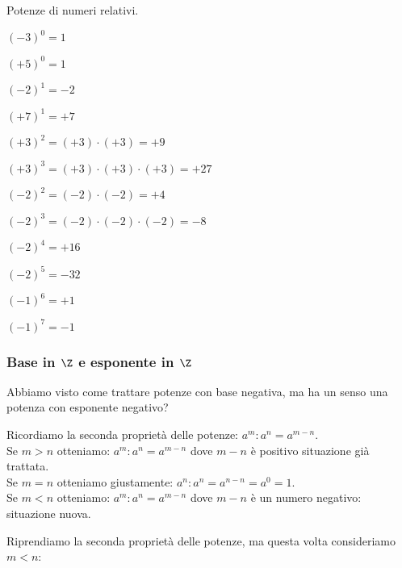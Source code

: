 \begin{esempio}{}{}
Potenze di numeri relativi.
\begin{multicols}{2}
\begin{itemize*}
\item \((-3)^0=1\)
\item \((+5)^0=1\) 
\item \((-2)^1=-2\) 
\item \((+7)^1=+7\) 
\item \((+3)^2=(+3)\cdot(+3)=+9\)
\item \((+3)^3=(+3)\cdot(+3)\cdot(+3)=+27\)
\item \((-2)^2=(-2)\cdot(-2)=+4\)
\item \((-2)^3=(-2)\cdot(-2)\cdot(-2)=-8\)
\item \((-2)^4=+16\)
\item \((-2)^5=-32\)
\item \((-1)^6=+1\)
\item \((-1)^7=-1\)
\end{itemize*}
\end{multicols}
\end{esempio}

% 

\subsubsection{Base in \(\Z\) e esponente in \(\Z\)}

Abbiamo visto come trattare potenze con base negativa, ma ha un senso una 
potenza con esponente negativo?

Ricordiamo la seconda proprietà delle potenze: \(a^m : a^n = a^{m-n}\). \\
Se \(m > n\) otteniamo: \(a^m : a^n = a^{m-n}\) dove \(m-n\) è 
positivo situazione già trattata.\\
Se \(m = n\) otteniamo giustamente: \(a^n : a^n = a^{n-n} = a^0 = 1\).\\
Se \(m < n\) otteniamo: \(a^m : a^n = a^{m-n}\) dove \(m-n\) è 
un numero negativo: situazione nuova.

Riprendiamo la seconda proprietà delle potenze, ma questa volta 
consideriamo \(m < n\):

